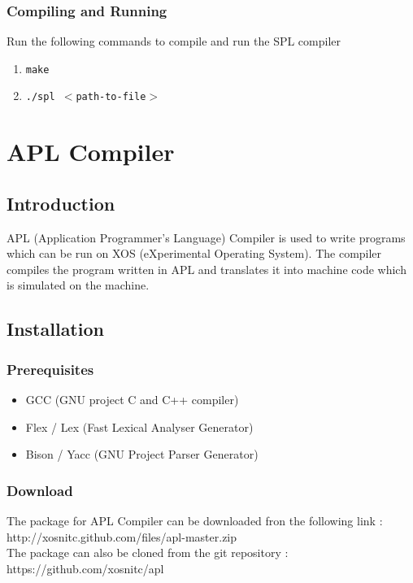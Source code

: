 \documentclass[11pt]{report}
\begin{document}
\subsection{Compiling and Running}
Run the following commands to compile and run the SPL compiler
\begin{enumerate}
		\item \texttt{make}
		\item \texttt{./spl $<$path-to-file$>$ }
\end{enumerate}


\chapter{APL Compiler}

\section{Introduction}
APL (Application Programmer's Language) Compiler is used to write programs which can be run on XOS (eXperimental Operating System). The compiler compiles the program written in APL and translates it into machine code which is simulated on the machine.

\section{Installation}

\subsection{Prerequisites}
\begin{itemize}
	\item GCC  (GNU project C and C++ compiler)
	\item Flex / Lex  (Fast Lexical Analyser Generator)
	\item Bison / Yacc  (GNU Project Parser Generator)
\end{itemize} 

\subsection{Download}
The package for APL Compiler can be downloaded fron the following link :\\
http://xosnitc.github.com/files/apl-master.zip\\
The package can also be cloned from the git repository : \\
https://github.com/xosnitc/apl
\end{document}

